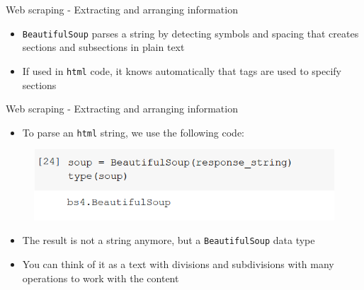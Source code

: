 \documentclass[aspectratio=169]{beamer}
\begin{document}
\begin{frame}{Web scraping - Extracting and arranging information}

	\begin{itemize}	
		\item \texttt{BeautifulSoup} parses a string by detecting symbols and spacing that creates sections and subsections in plain text
		\item If used in \texttt{html} code, it knows automatically that tags are used to specify sections
	\end{itemize}

\end{frame}

\begin{frame}{Web scraping - Extracting and arranging information}

	\begin{itemize}
		\item To parse an \texttt{html} string, we use the following code:
	\end{itemize}

	\begin{figure}
		\centering
		\includegraphics[width=0.7\linewidth]{img/bs4_type.png}
	\end{figure}

	\begin{itemize}	
		\item The result is not a string anymore, but a \texttt{BeautifulSoup} data type
		\item You can think of it as a text with divisions and subdivisions with many operations to work with the content
	\end{itemize}

\end{frame}
\end{document}
